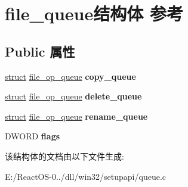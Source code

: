 \hypertarget{structfile__queue}{}\section{file\+\_\+queue结构体 参考}
\label{structfile__queue}
\subsection*{Public 属性}
\begin{DoxyCompactItemize}
\item 
\mbox{\label{structfile__queue_a3518ef254c47f90cabaa5d77c357c576}} 
\hyperlink{interfacestruct}{struct} \hyperlink{structfile__op__queue}{file\+\_\+op\+\_\+queue} {\bfseries copy\+\_\+queue}
\item 
\mbox{\label{structfile__queue_a7ecbd34a29a545185cdf54a287dd29ad}} 
\hyperlink{interfacestruct}{struct} \hyperlink{structfile__op__queue}{file\+\_\+op\+\_\+queue} {\bfseries delete\+\_\+queue}
\item 
\mbox{\label{structfile__queue_aa7ba9f080c8633cdec432ffade582f34}} 
\hyperlink{interfacestruct}{struct} \hyperlink{structfile__op__queue}{file\+\_\+op\+\_\+queue} {\bfseries rename\+\_\+queue}
\item 
\mbox{\label{structfile__queue_a063950d5829a52e3f808769d3cc83bab}} 
D\+W\+O\+RD {\bfseries flags}
\end{DoxyCompactItemize}


该结构体的文档由以下文件生成\+:\begin{DoxyCompactItemize}
\item 
E\+:/\+React\+O\+S-\/0../dll/win32/setupapi/queue.\+c\end{DoxyCompactItemize}
